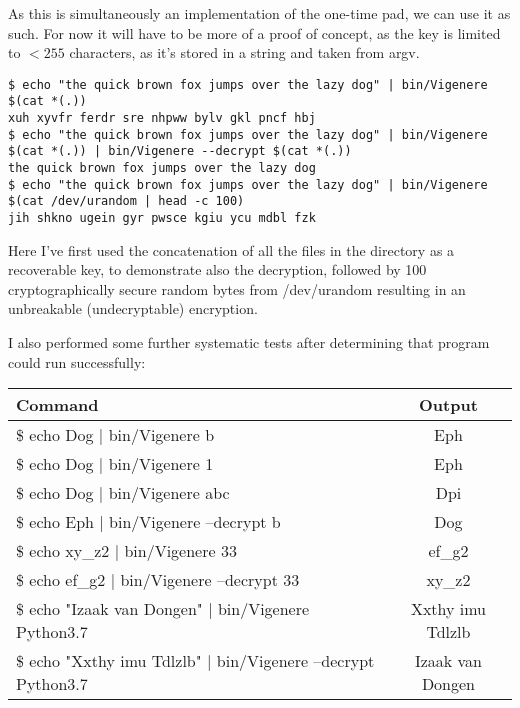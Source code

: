 \documentclass{article}
\newcommand\Tstrut{\rule{0pt}{2.6ex}}       %
\newcommand\Bstrut{\rule[-0.9ex]{0pt}{0pt}} %
\newcommand{\TBstrut}{\Tstrut\Bstrut} %
\begin{document}
    As this is simultaneously an implementation of the one-time pad, we can use
    it as such. For now it will have to be more of a proof of concept, as the
    key is limited to $< 255$ characters, as it's stored in a string and taken
    from argv.

\begin{lstlisting}[caption=Using the Vigen\`ere program for a one-time pad]
$ echo "the quick brown fox jumps over the lazy dog" | bin/Vigenere $(cat *(.))
xuh xyvfr ferdr sre nhpww bylv gkl pncf hbj
$ echo "the quick brown fox jumps over the lazy dog" | bin/Vigenere $(cat *(.)) | bin/Vigenere --decrypt $(cat *(.))
the quick brown fox jumps over the lazy dog
$ echo "the quick brown fox jumps over the lazy dog" | bin/Vigenere $(cat /dev/urandom | head -c 100)
jih shkno ugein gyr pwsce kgiu ycu mdbl fzk
\end{lstlisting}
\iffalse $ \fi %

    Here I've first used the concatenation of all the files in the directory as
    a recoverable key, to demonstrate also the decryption, followed by 100
    cryptographically secure random bytes from /dev/urandom resulting in an
    unbreakable (undecryptable) encryption.

    I also performed some further systematic tests after determining that
    program could run successfully:

	\begin{center}
		\begin{tabular}{||l | c||} 
		\hline
		Command & Output \TBstrut\\
		\hline\hline
        \$ echo Dog | bin/Vigenere b & Eph \Tstrut\\
        \$ echo Dog | bin/Vigenere 1 & Eph \\
        \$ echo Dog | bin/Vigenere abc & Dpi \\
        \$ echo Eph | bin/Vigenere --decrypt b & Dog \\
        \$ echo xy\_z2 | bin/Vigenere 33 & ef\_g2 \\
        \$ echo ef\_g2 | bin/Vigenere --decrypt 33 & xy\_z2 \\
        \$ echo "Izaak van Dongen" | bin/Vigenere Python3.7 & Xxthy imu Tdlzlb \\
        \$ echo "Xxthy imu Tdlzlb" | bin/Vigenere --decrypt Python3.7 & Izaak van Dongen \Bstrut\\
        \hline
	\end{tabular}
	\end{center}
\end{document}
